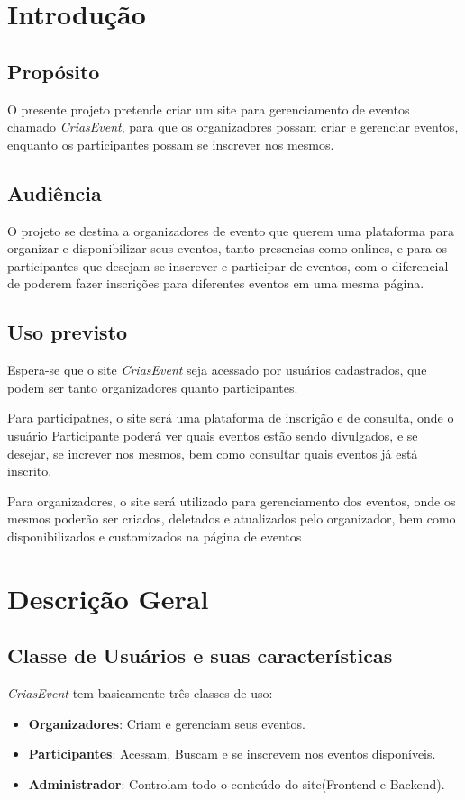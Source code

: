 \chapter{Introdução}
\label{ch:intro}
\section{Propósito}
    O presente projeto pretende criar um site para gerenciamento de eventos chamado \textit{CriasEvent}, para que os organizadores possam criar e gerenciar eventos, enquanto os participantes possam se inscrever nos mesmos.
\section{Audiência}
    O projeto se destina a organizadores de evento que querem uma plataforma para organizar e disponibilizar seus eventos, tanto presencias como onlines, e para os participantes que desejam se inscrever e participar de eventos, com o diferencial de poderem fazer inscrições para diferentes eventos em uma mesma página.
\section{Uso previsto}
  Espera-se que o site \textit{CriasEvent} seja acessado por usuários cadastrados, que podem ser tanto organizadores quanto participantes. 

  Para participatnes, o site será uma plataforma de inscrição e de consulta, onde o usuário Participante poderá ver quais eventos estão sendo divulgados, e se desejar, se increver nos mesmos, bem como consultar quais eventos já está inscrito. 

  Para organizadores, o site será utilizado para gerenciamento dos eventos, onde os mesmos poderão ser criados, deletados e atualizados pelo organizador, bem como disponibilizados e customizados na página de eventos



\chapter{Descrição Geral}
\label{Descrição Geral}

\section{Classe de Usuários e suas características}
\textit{CriasEvent} tem basicamente três classes de uso:
    \begin{itemize}
        \item \textbf{Organizadores}: Criam e gerenciam seus eventos.
        \item \textbf{Participantes}: Acessam, Buscam e se inscrevem nos eventos disponíveis.
        \item \textbf{Administrador}: Controlam todo o conteúdo do site(Frontend e Backend).
    \end{itemize}

